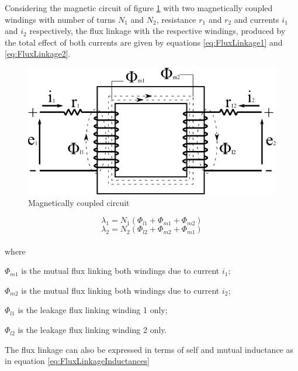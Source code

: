 Considering the magnetic circuit of figure \ref{fig:MagneticCircuit} with two magnetically coupled windings with number of turns $N_1$ and $N_2$, resistance $r_1$ and $r_2$ and currents $i_1$ and $i_2$ respectively, the flux linkage with the respective windings, produced by the total effect of both currents are given by equations \ref{eq:FluxLinkage1} and \ref{eq:FluxLinkage2}.

\begin{figure}[h]
	\centering
	\includegraphics[scale=0.6]{img/MagneticCircuit.png} 
	\caption{Magnetically coupled circuit}
	\label{fig:MagneticCircuit}
\end{figure}

\begin{equation} \label{eq:FluxLinkage1}
	\lambda_1 = N_1(\Phi_{l1} + \Phi_{m1} + \Phi_{m2})
\end{equation}
\begin{equation} \label{eq:FluxLinkage2}
	\lambda_2 = N_2(\Phi_{l2} + \Phi_{m2} + \Phi_{m1})
\end{equation}
\\
where

$\Phi_{m1}$ is the mutual flux linking both windings due to current $i_1$;

$\Phi_{m2}$ is the mutual flux linking both windings due to current $i_2$;

$\Phi_{l1}$ is the leakage flux linking winding 1 only;

$\Phi_{l2}$ is the leakage flux linking winding 2 only.

The flux linkage can also be expressed in terms of self and mutual inductance as in equation \ref{eq:FluxLinkageInductances}


